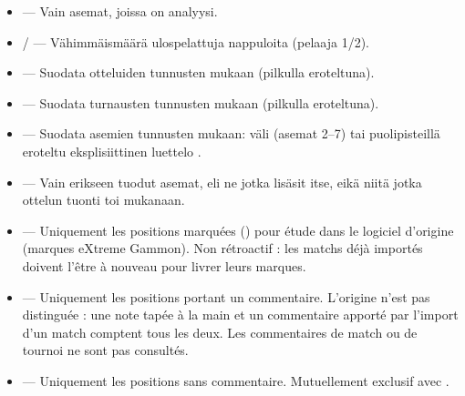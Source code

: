 \documentclass[letterpaper,10pt,finnish]{sphinxmanual}
\begin{document}
\begin{itemize}
\item {} 
\sphinxAtStartPar
{} — Vain asemat, joissa on analyysi.

\item {} 
\sphinxAtStartPar
{} /  — Vähimmäismäärä ulospelattuja nappuloita (pelaaja 1/2).

\item {} 
\sphinxAtStartPar
{} — Suodata otteluiden tunnusten mukaan (pilkulla eroteltuna).

\item {} 
\sphinxAtStartPar
{} — Suodata turnausten tunnusten mukaan (pilkulla eroteltuna).

\item {} 
\sphinxAtStartPar
{} — Suodata asemien tunnusten mukaan: väli  (asemat 2–7) tai puolipisteillä eroteltu eksplisiittinen luettelo .

\item {} 
\sphinxAtStartPar
{} — Vain erikseen tuodut asemat, eli ne jotka lisäsit itse, eikä niitä jotka ottelun tuonti toi mukanaan.

\item {} 
\sphinxAtStartPar
{} — Uniquement les positions marquées () pour étude dans
le logiciel d’origine (marques eXtreme Gammon). Non rétroactif : les
matchs déjà importés doivent l’être à nouveau pour livrer leurs marques.

\item {} 
\sphinxAtStartPar
{} — Uniquement les positions portant un commentaire.
L’origine n’est pas distinguée : une note tapée à la main et un commentaire
apporté par l’import d’un match comptent tous les deux. Les commentaires de
match ou de tournoi ne sont pas consultés.

\item {} 
\sphinxAtStartPar
{} — Uniquement les positions sans commentaire. Mutuellement
exclusif avec .

\end{itemize}
\end{document}
